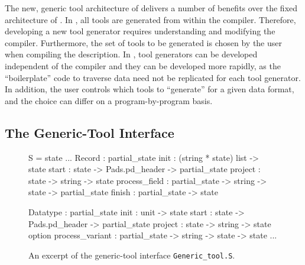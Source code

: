 The new, generic tool architecture of \padsml{} delivers a number of
benefits over the fixed architecture of \padsc{}. In \padsc{}, all
tools are generated from within the compiler. Therefore, developing a
new tool generator requires understanding and modifying the compiler.
Furthermore, the set of tools to be generated is chosen by the user
when compiling the description.  In \padsml{}, tool generators can be
developed independent of the compiler and they can be developed more
rapidly, as the ``boilerplate'' code to traverse data need not be
replicated for each tool generator. In addition, the user controls
which tools to ``generate'' for a given data format, and the choice
can differ on a program-by-program basis.

\subsection{The Generic-Tool Interface}
\label{sec:gentool-interface}

\begin{figure}
\begin{code}\scriptsize
{}  S = 
   state
  ...
   Record : 
     partial_state
      init          : (string * state) list -> state
      start         : state -> Pads.pd_header 
                         -> partial_state
      project       : state -> string -> state
      process_field : partial_state -> string
                         -> state -> partial_state
      finish        : partial_state -> state

   Datatype : 
     partial_state
      init            : unit -> state
      start           : state -> Pads.pd_header 
                           -> partial_state
      project         : state -> string -> state option
      process_variant : partial_state -> string 
                           -> state -> state
   ...
\end{code}
\caption{An excerpt of the generic-tool interface \texttt{Generic\_tool.S}.}
\label{fig:gentool-interface}
\end{figure}


